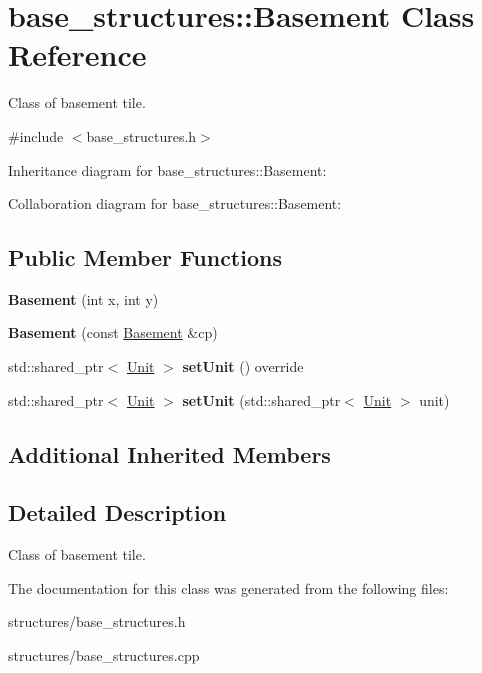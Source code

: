 \hypertarget{classbase__structures_1_1Basement}{}\section{base\+\_\+structures\+:\+:Basement Class Reference}
\label{classbase__structures_1_1Basement}


Class of basement tile.  




{\ttfamily \#include $<$base\+\_\+structures.\+h$>$}



Inheritance diagram for base\+\_\+structures\+:\+:Basement\+:


Collaboration diagram for base\+\_\+structures\+:\+:Basement\+:
\subsection*{Public Member Functions}
\begin{DoxyCompactItemize}
\item 
\mbox{\label{classbase__structures_1_1Basement_a5a372712cd0b2c30ad3c95f3e0aaaf47}} 
{\bfseries Basement} (int x, int y)
\item 
\mbox{\label{classbase__structures_1_1Basement_a48529f196de61983394412163651ac87}} 
{\bfseries Basement} (const \hyperlink{classbase__structures_1_1Basement}{Basement} \&cp)
\item 
\mbox{\label{classbase__structures_1_1Basement_a35b9d6c8b0d1346701add8a4ff663bb3}} 
std\+::shared\+\_\+ptr$<$ \hyperlink{classbase__structures_1_1Unit}{Unit} $>$ {\bfseries set\+Unit} () override
\item 
\mbox{\label{classbase__structures_1_1Basement_a256a22b235b706490f5bc6a364525622}} 
std\+::shared\+\_\+ptr$<$ \hyperlink{classbase__structures_1_1Unit}{Unit} $>$ {\bfseries set\+Unit} (std\+::shared\+\_\+ptr$<$ \hyperlink{classbase__structures_1_1Unit}{Unit} $>$ unit)
\end{DoxyCompactItemize}
\subsection*{Additional Inherited Members}


\subsection{Detailed Description}
Class of basement tile. 

The documentation for this class was generated from the following files\+:\begin{DoxyCompactItemize}
\item 
structures/base\+\_\+structures.\+h\item 
structures/base\+\_\+structures.\+cpp\end{DoxyCompactItemize}
